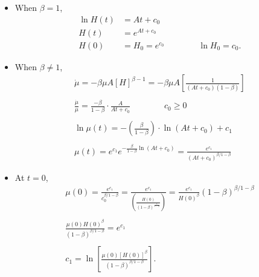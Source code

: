 \documentclass[12pt,compress,handout]{beamer}  %
\begin{document}
\begin{frame}
\begin{itemize}[<+->]
\item
When $\beta =1$,
\begin{align*}
\ln H(t) &= At+c_{0} \\
H(t) &= e^{At+c_{0}} \\
H(0) &= H_{0}=e^{c_{0}}\qquad \qquad \ln H_{0}=c_{0}.
\end{align*}
\end{itemize}
\end{frame}


\begin{frame}
\begin{itemize}[<+->]
\item
When $\beta \neq 1$,
\begin{gather*}
\dot{\mu} = -\beta \mu A[H]^{\beta -1} = -\beta \mu A\left[ \frac{1}{(At+c_{0})(1-\beta )}\right] \\
\\
\frac{\dot{\mu}}{\mu }=\frac{-\beta }{1-\beta }\cdot \frac{A}{At+c_{0}}\qquad \qquad c_{0}\geq 0 \\
\\
\ln \mu (t) = -\left( \frac{\beta }{1-\beta }\right) \cdot \ln
(At+c_{0}) +c_{1} \\
\\
\mu (t) = e^{c_{1}}e^{-\frac{\beta }{1-\beta }\ln (At+c_{0})} =
\frac{e^{c_{1}}}{(At+c_{0})^{\beta /1-\beta }}
\end{gather*}
\end{itemize}
\end{frame}


\begin{frame}
\begin{itemize}[<+->]
\item
At $t=0$,
\begin{gather*}
\mu (0)=\frac{e^{c_{1}}}{c_{0}^{\beta /1-\beta }} =
\frac{e^{c_{1}}}{\left( \frac{H(0)}{(1-\beta )^{\frac{1}{1-\beta
}}}\right) } = \frac{e^{c_{1}}}{H(0)^{\beta }}(1-\beta )^{\beta
/1-\beta } \\
\\
\frac{\mu (0)H(0)^{\beta }}{(1-\beta )^{\beta /1-\beta }} = e^{c_{1}} \\
\\
c_{1} = \ln \left[ \frac{\mu (0)[H(0)]^{\beta }}{(1-\beta )^{\beta
/1-\beta }}\right] .
\end{gather*}
\end{itemize}
\end{frame}
\end{document}
